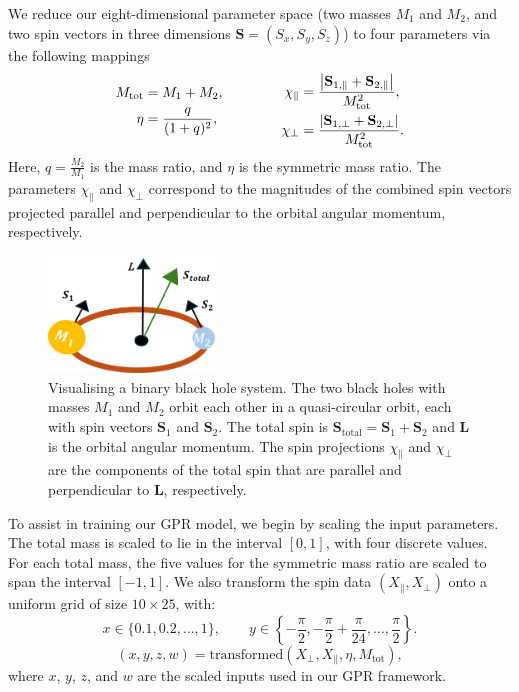 \documentclass{ucdgradtaughtthesis}
\begin{document}
We reduce our eight-dimensional parameter space (two masses \(M_1\) and \(M_2\), and two spin vectors in three dimensions \(\mathbf{S} = (S_x, S_y, S_z)\)) to four parameters via the following mappings   
\begin{align}
    \begin{aligned}
    M_{\mathrm{tot}} & = M_1 + M_2, \\
    \eta & = \frac{q}{(1 + q)^2},
    \end{aligned}
    \hspace{1.5cm}
    \begin{aligned}
    \chi_{\parallel} &= \frac{\left|\mathbf{S}_{1,\parallel} + \mathbf{S}_{2,\parallel}\right|}{M_{\mathrm{tot}}^2}, \\
    \chi_{\perp} &= \frac{\left|\mathbf{S}_{1,\perp} + \mathbf{S}_{2,\perp}\right|}{M_{\mathrm{tot}}^2}.
    \end{aligned}
\end{align}
Here, \( q = \frac{M_2}{M_1} \) is the mass ratio, and \( \eta \) is the symmetric mass ratio. The parameters \( \chi_{\parallel} \) and \( \chi_{\perp} \) correspond to the magnitudes of the combined spin vectors projected parallel and perpendicular to the orbital angular momentum, respectively.
\begin{figure}[H]
    \centering
    \includegraphics[width=0.4\textwidth]{LatexPlots/GRdiagram.png}
    \caption[Visualising a binary black hole system and its intrinsic parameters]{Visualising a binary black hole system. The two black holes with masses \(M_1\) and \(M_2\) orbit each other in a quasi-circular orbit, 
    each with spin vectors \(\mathbf{S}_1\) and \(\mathbf{S}_2\). The total spin is \(\mathbf{S}_{\text{total}} = \mathbf{S}_1+\mathbf{S}_2\) and \(\mathbf{L}\) is the orbital angular momentum. 
    The spin projections \( \chi_{\parallel} \) and \( \chi_{\perp} \) are the components of the total spin that are parallel and perpendicular to \( \mathbf{L} \), respectively.}
    \label{fig:gr_diagram}
\end{figure}
To assist in training our GPR model, we begin by scaling the input parameters. The total mass is scaled to lie in the interval \([0, 1]\), with four discrete values. For each total mass, the five values for the symmetric mass ratio are scaled to span the interval \([-1, 1]\). 
We also transform the spin data \((X_{\parallel}, X_{\perp})\) onto a uniform grid of size \(10 \times 25\), with:
\[
x \in \{0.1, 0.2, \ldots, 1\}, \qquad y \in \left\{-\frac{\pi}{2},-\frac{\pi}{2}+\frac{\pi}{24},\ldots, \frac{\pi}{2}\right\}.
\]
\begin{equation}
(x, y, z, w) = \text{transformed}(X_{\perp}, X_{\parallel}, \eta, M_{\text{tot}}),
\end{equation}
where \(x\), \(y\), \(z\), and \(w\) are the scaled inputs used in our GPR framework.
\end{document}
